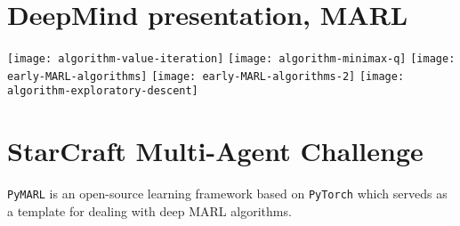 \documentclass{article}
\begin{document}
\section*{DeepMind presentation, MARL}\label{sec.deepmind}
\texttt{[image: algorithm-value-iteration]}
\texttt{[image: algorithm-minimax-q]}
\texttt{[image: early-MARL-algorithms]}
\texttt{[image: early-MARL-algorithms-2]}
\texttt{[image: algorithm-exploratory-descent]}


\section*{StarCraft Multi-Agent Challenge}        \label{sec.smac}
\texttt{PyMARL} is an open-source learning framework based on
\texttt{PyTorch} which serveds as a template for dealing with deep MARL algorithms.
\end{document}
